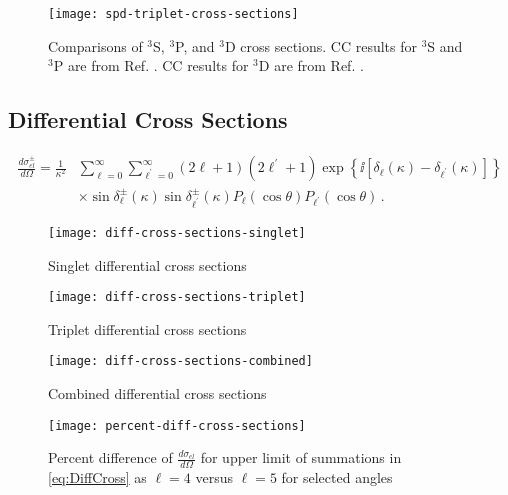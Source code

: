 \documentclass[Dissertation.tex]{subfiles}
\begin{document}
\begin{figure}[H]
	\centering
	\texttt{[image: spd-triplet-cross-sections]}
	\caption[Comparisons of $^3$S, $^3$P, and $^3$D cross sections.]{Comparisons of $^3$S, $^3$P, and $^3$D cross sections. CC results for $^3$S and $^3$P are from Ref. \cite{Walters2004}. CC results for $^3$D are from Ref. \cite{Blackwood2002}.}
	\label{fig:spd-triplet-cross-sections}
\end{figure}


\subsection{Differential Cross Sections}
\label{sec:diffcross}

\begin{align}
\label{eq:DiffCross}
\nonumber \frac{d\sigma_{el}^\pm}{d\Omega} = \frac{1}{\kappa^2} & \sum_{\ell=0}^\infty \sum_{\ell^\prime=0}^\infty (2\ell+1)(2\ell^\prime+1) \exp\left\{\ii \left[\delta_\ell(\kappa) - \delta_{\ell^\prime}(\kappa) \right] \right\} \\
& \times \sin\delta_\ell^\pm(\kappa) \sin\delta_{\ell^\prime}^\pm(\kappa) P_\ell(\cos\theta) P_{\ell^\prime}(\cos\theta)\,.
\end{align}

\begin{figure}[H]
	\centering
	\texttt{[image: diff-cross-sections-singlet]}
	\caption{Singlet differential cross sections}
	\label{fig:diff-cross-sections-singlet}
\end{figure}

\begin{figure}[H]
	\centering
	\texttt{[image: diff-cross-sections-triplet]}
	\caption{Triplet differential cross sections}
	\label{fig:diff-cross-sections-triplet}
\end{figure}

\begin{figure}[H]
	\centering
	\texttt{[image: diff-cross-sections-combined]}
	\caption{Combined differential cross sections}
	\label{fig:diff-cross-sections-combined}
\end{figure}

\begin{figure}[H]
	\centering
	\texttt{[image: percent-diff-cross-sections]}
	\caption[Percent difference of differential cross sections at selected angles]{Percent difference of $\frac{d\sigma_{el}}{d\Omega}$ for upper limit of summations in \ref{eq:DiffCross} as $\ell = 4$ versus $\ell = 5$ for selected angles}
	\label{fig:percent-diff-cross-sections}
\end{figure}
\end{document}

